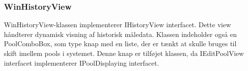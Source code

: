 \subsubsection{WinHistoryView}
WinHistoryView-klassen implementerer IHistoryView interfacet. Dette view håndterer dynamisk visning af historisk måledata.
Klassen indeholder også en PoolComboBox, som type knap med en liste, der er tænkt at skulle bruges til skift imellem pools i systemet. Denne knap er tilføjet klassen, da IEditPoolView interfacet implementerer IPoolDisplaying interfacet. 